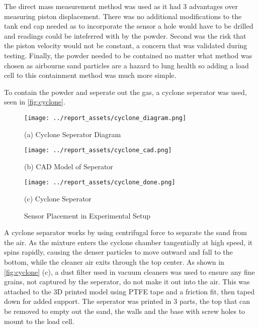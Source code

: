 The direct mass measurement method was used as it had 3 advantages over measuring piston displacement. There was no additional modifications to the tank end cap needed as to incorporate the sensor a hole would have to be drilled and readings could be inteferred with by the powder. Second was the risk that the piston velocity would not be constant, a concern that was validated during testing. Finally, the powder needed to be contained no matter what method was chosen as airbourne sand particles are a hazard to lung health so adding a load cell to this containment method was much more simple.

To contain the powder and seperate out the gas, a cyclone seperator was used, seen in \autoref{fig:cyclone}.
\begin{figure}[htbp]
    \centering

    \begin{minipage}{0.3\textwidth}
        \centering
        \texttt{[image: ../report\_assets/cyclone\_diagram.png]}
        \caption*{(a) Cyclone Seperator Diagram}
    \end{minipage}
    \hfill
    \begin{minipage}{0.3\textwidth}
        \centering
        \texttt{[image: ../report\_assets/cyclone\_cad.png]}
        \caption*{(b) CAD Model of Seperator}
    \end{minipage}
    \hfill
    \begin{minipage}{0.3\textwidth}
        \centering
        \texttt{[image: ../report\_assets/cyclone\_done.png]}
        \caption*{(c) Cyclone Seperator}
    \end{minipage}
    \caption{Sensor Placement in Experimental Setup}\label{fig:cyclone}
\end{figure}
A cyclone separator works by using centrifugal force to separate the sand from the air. As the mixture enters the cyclone chamber tangentially at high speed, it spins rapidly, causing the denser particles to move outward and fall to the bottom, while the cleaner air exits through the top center. As shown in \autoref{fig:cyclone} (c), a dust filter used in vacuum cleaners was used to ensure any fine grains, not captured by the seperator, do not make it out into the air. This was attached to the 3D printed model using PTFE tape and a friction fit, then taped down for added support. The seperator was printed in 3 parts, the top that can be removed to empty out the sand, the walls and the base with screw holes to mount to the load cell.

